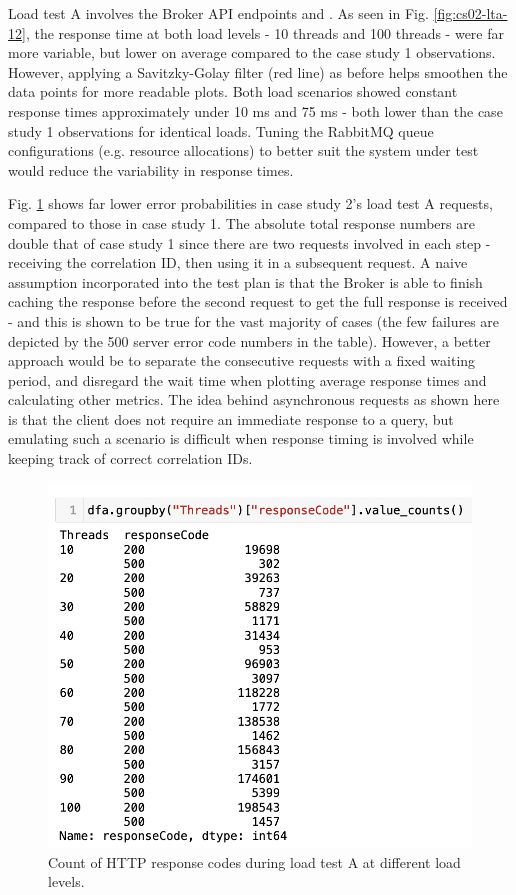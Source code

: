 Load test A involves the Broker API endpoints  and . As seen in Fig. \ref{fig:cs02-lta-12}, the response time at both load levels - 10 threads and 100 threads - were far more variable, but lower on average compared to the case study 1 observations. However, applying a Savitzky-Golay filter (red line) as before helps smoothen the data points for more readable plots. Both load scenarios showed constant response times approximately under 10 ms and 75 ms - both lower than the case study 1 observations for identical loads. Tuning the RabbitMQ queue configurations (e.g. resource allocations) to better suit the system under test would reduce the variability in response times.

Fig. \ref{fig:cs02-lta-3} shows far lower error probabilities in case study 2's load test A requests, compared to those in case study 1. The absolute total response numbers are double that of case study 1 since there are two requests involved in each step - receiving the correlation ID, then using it in a subsequent request. A naive assumption incorporated into the test plan is that the Broker is able to finish caching the response before the second request to get the full response is received - and this is shown to be true for the vast majority of cases (the few failures are depicted by the 500 server error code numbers in the table). However, a better approach would be to separate the consecutive requests with a fixed waiting period, and disregard the wait time when plotting average response times and calculating other metrics. The idea behind asynchronous requests as shown here is that the client does not require an immediate response to a query, but emulating such a scenario is difficult when response timing is involved while keeping track of correct correlation IDs.

\begin{figure}[H]
  \centering
  \includegraphics[width=0.5\linewidth]{./assets/images/case-studies/cs02-lta-3.png}
  \caption{Count of HTTP response codes during load test A at different load levels.}
  \label{fig:cs02-lta-3}
\end{figure}

